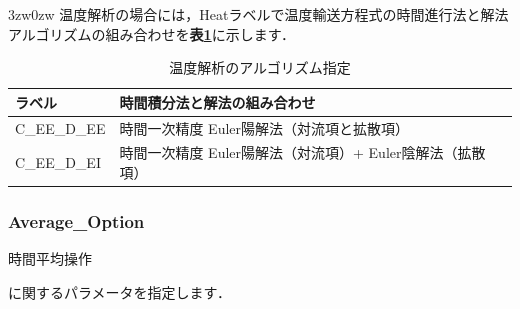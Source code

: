 \begin{indentation}{3zw}{0zw}
温度解析の場合には，Heatラベルで温度輸送方程式の時間進行法と解法アルゴリズムの組み合わせを\textbf{表\ref{tbl:alg_heat}}に示します．\\

\begin{table}[htdp]
\caption{温度解析のアルゴリズム指定}
\begin{center}
\small
\begin{tabular}{ll} \toprule
ラベル & 時間積分法と解法の組み合わせ\\ \midrule
C\_EE\_D\_EE & 時間一次精度 Euler陽解法（対流項と拡散項）\\
C\_EE\_D\_EI & 時間一次精度 Euler陽解法（対流項）+ Euler陰解法（拡散項）\\ \bottomrule
\end{tabular}
\end{center}
\label{tbl:alg_heat}
\end{table}
\end{indentation}



\pagebreak
\subsubsection{Average\_Option}

\hypertarget{tgt:average_option}{時間平均操作}に関するパラメータを指定します．

